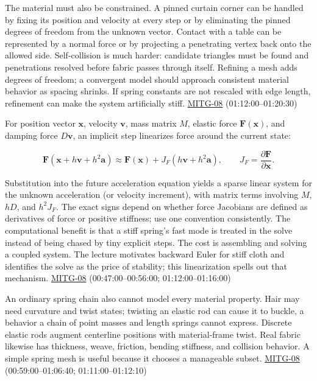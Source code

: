 The material must also be constrained. A pinned curtain corner can be handled by fixing its position and velocity at every step or by eliminating the pinned degrees of freedom from the unknown vector. Contact with a table can be represented by a normal force or by projecting a penetrating vertex back onto the allowed side. Self-collision is much harder: candidate triangles must be found and penetrations resolved before fabric passes through itself. Refining a mesh adds degrees of freedom; a convergent model should approach consistent material behavior as spacing shrinks. If spring constants are not rescaled with edge length, refinement can make the system artificially stiff. \hyperref[04-visual-computing-ii-ch036]{MITG-08} (01:12:00--01:20:30)

For position vector \(\boldsymbol{x}\), velocity \(\boldsymbol{v}\), mass matrix \(M\), elastic force \(\boldsymbol{F}(\boldsymbol{x})\), and damping force \(D\boldsymbol{v}\), an implicit step linearizes force around the current state:

\[
\boldsymbol{F}(\boldsymbol{x}+h\boldsymbol{v}+h^2\boldsymbol{a})
\approx \boldsymbol{F}(\boldsymbol{x})
+J_F(h\boldsymbol{v}+h^2\boldsymbol{a}),
\qquad J_F=\frac{\partial \boldsymbol{F}}{\partial \boldsymbol{x}}.
\]

Substitution into the future acceleration equation yields a sparse linear system for the unknown acceleration (or velocity increment), with matrix terms involving \(M\), \(hD\), and \(h^2J_F\). The exact signs depend on whether force Jacobians are defined as derivatives of force or positive stiffness; use one convention consistently. The computational benefit is that a stiff spring's fast mode is treated in the solve instead of being chased by tiny explicit steps. The cost is assembling and solving a coupled system. The lecture motivates backward Euler for stiff cloth and identifies the solve as the price of stability; this linearization spells out that mechanism. \hyperref[04-visual-computing-ii-ch036]{MITG-08} (00:47:00--00:56:00; 01:12:00--01:16:00)

An ordinary spring chain also cannot model every material property. Hair may need curvature and twist states; twisting an elastic rod can cause it to buckle, a behavior a chain of point masses and length springs cannot express. Discrete elastic rods augment centerline positions with material-frame twist. Real fabric likewise has thickness, weave, friction, bending stiffness, and collision behavior. A simple spring mesh is useful because it chooses a manageable subset. \hyperref[04-visual-computing-ii-ch036]{MITG-08} (00:59:00--01:06:40; 01:11:00--01:12:10)

